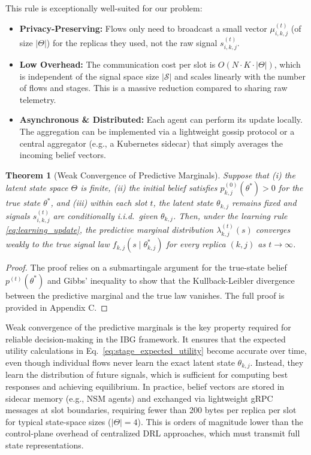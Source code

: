 \documentclass[journal]{IEEEtran}
\theoremstyle{plain}
\newtheorem{theorem}{Theorem}
\theoremstyle{definition}
\theoremstyle{remark}
\begin{document}
This rule is exceptionally well-suited for our problem:
\begin{itemize}
    \item \textbf{Privacy-Preserving:} Flows only need to broadcast a small vector $\mu_{i,k,j}^{(t)}$ (of size $|\Theta|$) for the replicas they used, not the raw signal $s_{i,k,j}^{(t)}$.
    \item \textbf{Low Overhead:} The communication cost per slot is $O(N \cdot K \cdot |\Theta|)$, which is independent of the signal space size $|\mathcal{S}|$ and scales linearly with the number of flows and stages. This is a massive reduction compared to sharing raw telemetry.
    \item \textbf{Asynchronous \& Distributed:} Each agent can perform its update locally. The aggregation can be implemented via a lightweight gossip protocol or a central aggregator (e.g., a Kubernetes sidecar) that simply averages the incoming belief vectors.
\end{itemize}

\begin{theorem}[Weak Convergence of Predictive Marginals]
\label{thm:weak_convergence}
Suppose that (i) the latent state space $\Theta$ is finite, (ii) the initial belief satisfies $p_{k,j}^{(0)}(\theta^*) > 0$ for the true state $\theta^*$, and (iii) within each slot $t$, the latent state $\theta_{k,j}$ remains fixed and signals $s_{i,k,j}^{(t)}$ are conditionally i.i.d.\ given $\theta_{k,j}$. Then, under the learning rule \eqref{eq:learning_update}, the predictive marginal distribution $\lambda_{k,j}^{(t)}(s)$ converges weakly to the true signal law $f_{k,j}(s \mid \theta_{k,j}^*)$ for every replica $(k,j)$ as $t \to \infty$.
\end{theorem}
\begin{proof}
The proof relies on a submartingale argument for the true-state belief $p^{(t)}(\theta^*)$ and Gibbs' inequality to show that the Kullback-Leibler divergence between the predictive marginal and the true law vanishes. The full proof is provided in Appendix C.
\end{proof}

Weak convergence of the predictive marginals is the key property required for reliable decision-making in the IBG framework. It ensures that the expected utility calculations in Eq.~\eqref{eq:stage_expected_utility} become accurate over time, even though individual flows never learn the exact latent state $\theta_{k,j}$. Instead, they learn the distribution of future signals, which is sufficient for computing best responses and achieving equilibrium. In practice, belief vectors are stored in sidecar memory (e.g., NSM agents) and exchanged via lightweight gRPC messages at slot boundaries, requiring fewer than 200 bytes per replica per slot for typical state-space sizes ($|\Theta|=4$). This is orders of magnitude lower than the control-plane overhead of centralized DRL approaches, which must transmit full state representations.
\end{document}
